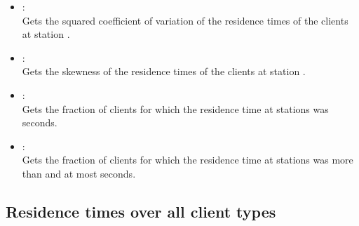 \begin{itemize}
\item
{}:\\
Gets the squared coefficient of variation of the residence times of the clients at station .

\item
{}:\\
Gets the skewness of the residence times of the clients at station . 

\item
{}:\\
Gets the fraction of clients for which the residence time at stations  was  seconds.

\item
{}:\\
Gets the fraction of clients for which the residence time at stations  was more than  and at most  seconds.

\end{itemize}



\subsection{Residence times over all client types}
  
